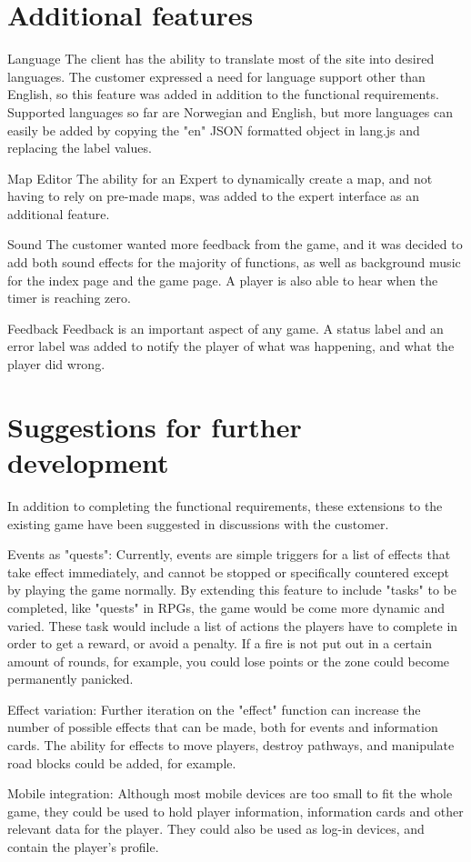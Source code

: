 \section{Additional features}

Language
The client has the ability to translate most of the site into desired languages. The customer expressed a need for language support other than English, so this feature was added in addition to the functional requirements. Supported languages so far are Norwegian and English, but more languages can easily be added by copying the "en" JSON formatted object in lang.js and replacing the label values.

Map Editor
The ability for an Expert to dynamically create a map, and not having to rely on pre-made maps, was added to the expert interface as an additional feature.

Sound
The customer wanted more feedback from the game, and it was decided to add both sound effects for the majority of functions, as well as background music for the index page and the game page. A player is also able to hear when the timer is reaching zero.

Feedback
Feedback is an important aspect of any game. A status label and an error label was added to notify the player of what was happening, and what the player did wrong.

\section{Suggestions for further development}

In addition to completing the functional requirements, these extensions to the existing game have been suggested in discussions with the customer.

Events as "quests":
Currently, events are simple triggers for a list of effects that take effect immediately, and cannot be stopped or specifically countered except by playing the game normally. By extending this feature to include "tasks" to be completed, like "quests" in RPGs, the game would be come more dynamic and varied. These task would include a list of actions the players have to complete in order to get a reward, or avoid a penalty. If a fire is not put out in a certain amount of rounds, for example, you could lose points or the zone could become permanently panicked.

Effect variation:
Further iteration on the "effect" function can increase the number of possible effects that can be made, both for events and information cards. The ability for effects to move players, destroy pathways, and manipulate road blocks could be added, for example.

Mobile integration:
Although most mobile devices are too small to fit the whole game, they could be used to hold player information, information cards and other relevant data for the player. They could also be used as log-in devices, and contain the player's profile.


